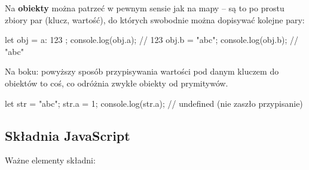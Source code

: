 Na \textbf{obiekty} można patrzeć w pewnym sensie jak na mapy -- są to po prostu zbiory par (klucz, wartość), do których swobodnie można dopisywać kolejne pary:
\begin{js}
    let obj = { a: 123 };
    console.log(obj.a); // 123
    obj.b = "abc";
    console.log(obj.b); // "abc"
\end{js}

Na boku: powyższy sposób przypisywania wartości pod danym kluczem do obiektów to coś, co odróżnia zwykłe obiekty od prymitywów.
\begin{js}
    let str = "abc";
    str.a = 1;
    console.log(str.a); // undefined (nie zaszło przypisanie)
\end{js}

\subsection{Składnia JavaScript}
Ważne elementy składni:
